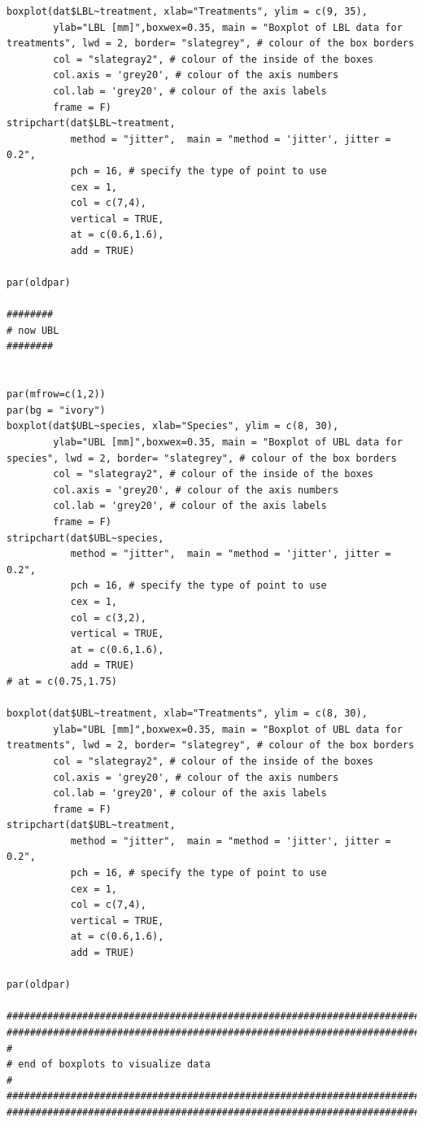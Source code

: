 \documentclass{article}
\begin{document}
\begin{verbatim}
boxplot(dat$LBL~treatment, xlab="Treatments", ylim = c(9, 35),
        ylab="LBL [mm]",boxwex=0.35, main = "Boxplot of LBL data for treatments", lwd = 2, border= "slategrey", # colour of the box borders
        col = "slategray2", # colour of the inside of the boxes
        col.axis = 'grey20', # colour of the axis numbers 
        col.lab = 'grey20', # colour of the axis labels
        frame = F)
stripchart(dat$LBL~treatment,
           method = "jitter",  main = "method = 'jitter', jitter = 0.2",
           pch = 16, # specify the type of point to use
           cex = 1,
           col = c(7,4),
           vertical = TRUE, 
           at = c(0.6,1.6),
           add = TRUE)

par(oldpar)

########
# now UBL
########


par(mfrow=c(1,2))
par(bg = "ivory")
boxplot(dat$UBL~species, xlab="Species", ylim = c(8, 30),
        ylab="UBL [mm]",boxwex=0.35, main = "Boxplot of UBL data for species", lwd = 2, border= "slategrey", # colour of the box borders
        col = "slategray2", # colour of the inside of the boxes
        col.axis = 'grey20', # colour of the axis numbers 
        col.lab = 'grey20', # colour of the axis labels
        frame = F)
stripchart(dat$UBL~species,
           method = "jitter",  main = "method = 'jitter', jitter = 0.2",
           pch = 16, # specify the type of point to use
           cex = 1,
           col = c(3,2),
           vertical = TRUE, 
           at = c(0.6,1.6),
           add = TRUE)
# at = c(0.75,1.75)

boxplot(dat$UBL~treatment, xlab="Treatments", ylim = c(8, 30),
        ylab="UBL [mm]",boxwex=0.35, main = "Boxplot of UBL data for treatments", lwd = 2, border= "slategrey", # colour of the box borders
        col = "slategray2", # colour of the inside of the boxes
        col.axis = 'grey20', # colour of the axis numbers 
        col.lab = 'grey20', # colour of the axis labels
        frame = F)
stripchart(dat$UBL~treatment,
           method = "jitter",  main = "method = 'jitter', jitter = 0.2",
           pch = 16, # specify the type of point to use
           cex = 1,
           col = c(7,4),
           vertical = TRUE, 
           at = c(0.6,1.6),
           add = TRUE)

par(oldpar)

##############################################################################
##############################################################################
#
# end of boxplots to visualize data
#
##############################################################################
##############################################################################




\end{verbatim}
\end{document}
